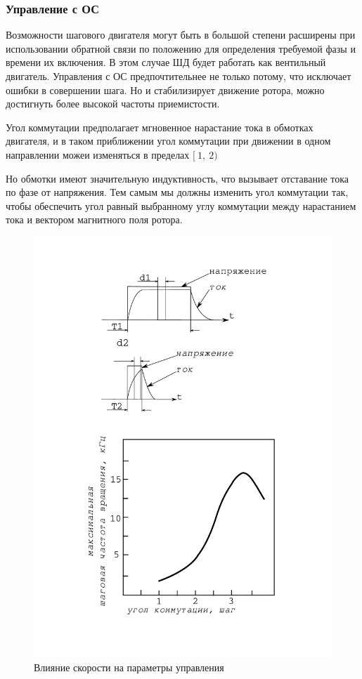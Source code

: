 \newpage
\subsubsection{ Управление с ОС }
Возможности шагового двигателя могут быть в большой степени расширены при использовании обратной
связи по положению для определения требуемой фазы и времени их включения. В этом случае ШД будет
работать как вентильный двигатель. Управления с ОС предпочтительнее не только потому, что исключает
ошибки в совершении шага. Но и стабилизирует движение ротора, можно достигнуть более высокой
частоты приемистости.

Угол коммутации предполагает мгновенное нарастание тока в обмотках двигателя, и в таком приближении
угол коммутации при движении в одном направлении можеи изменяться в пределах $[~1,~2)$

Но обмотки имеют значительную индуктивность, что вызывает отставание тока по фазе от напряжения.
Тем самым мы должны изменить угол коммутации так, чтобы обеспечить угол равный выбранному углу
коммутации между нарастанием тока и вектором магнитного поля ротора.

\begin{figure}
\centering
\includegraphics[width=\textwidth, keepaspectratio]{./src/pictures/max_step_motor_by_com_angle}
\caption{Влияние скорости на параметры управления}
\label{graph_speed_and_angle_comutation}
\end{figure}


